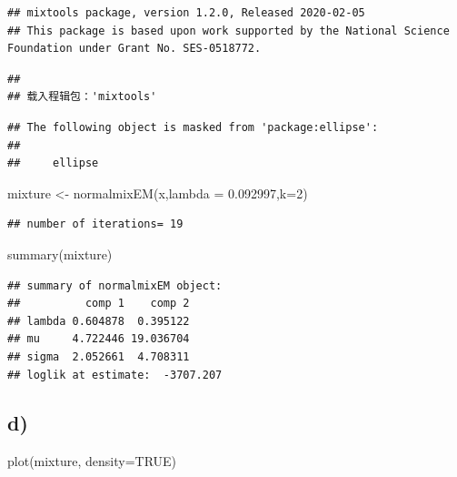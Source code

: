 \documentclass[
]{article}
\newenvironment{Shaded}{\begin{snugshade}}{\end{snugshade}}
\newcommand{\AttributeTok}[1]{\textcolor[rgb]{0.77,0.63,0.00}{#1}}
\newcommand{\ConstantTok}[1]{\textcolor[rgb]{0.00,0.00,0.00}{#1}}
\newcommand{\DecValTok}[1]{\textcolor[rgb]{0.00,0.00,0.81}{#1}}
\newcommand{\FloatTok}[1]{\textcolor[rgb]{0.00,0.00,0.81}{#1}}
\newcommand{\FunctionTok}[1]{\textcolor[rgb]{0.00,0.00,0.00}{#1}}
\newcommand{\NormalTok}[1]{#1}
\newcommand{\OtherTok}[1]{\textcolor[rgb]{0.56,0.35,0.01}{#1}}
\begin{document}
\begin{verbatim}
## mixtools package, version 1.2.0, Released 2020-02-05
## This package is based upon work supported by the National Science Foundation under Grant No. SES-0518772.
\end{verbatim}

\begin{verbatim}
## 
## 载入程辑包：'mixtools'
\end{verbatim}

\begin{verbatim}
## The following object is masked from 'package:ellipse':
## 
##     ellipse
\end{verbatim}

\begin{Shaded}
\begin{Highlighting}[]
\NormalTok{mixture }\OtherTok{\textless{}{-}} \FunctionTok{normalmixEM}\NormalTok{(x,}\AttributeTok{lambda =} \FloatTok{0.092997}\NormalTok{,}\AttributeTok{k=}\DecValTok{2}\NormalTok{)}
\end{Highlighting}
\end{Shaded}

\begin{verbatim}
## number of iterations= 19
\end{verbatim}

\begin{Shaded}
\begin{Highlighting}[]
\FunctionTok{summary}\NormalTok{(mixture)}
\end{Highlighting}
\end{Shaded}

\begin{verbatim}
## summary of normalmixEM object:
##          comp 1    comp 2
## lambda 0.604878  0.395122
## mu     4.722446 19.036704
## sigma  2.052661  4.708311
## loglik at estimate:  -3707.207
\end{verbatim}

\hypertarget{d-1}{%
\subsection{d)}\label{d-1}}

\begin{Shaded}
\begin{Highlighting}[]
\FunctionTok{plot}\NormalTok{(mixture, }\AttributeTok{density=}\ConstantTok{TRUE}\NormalTok{)}
\end{Highlighting}
\end{Shaded}
\end{document}
